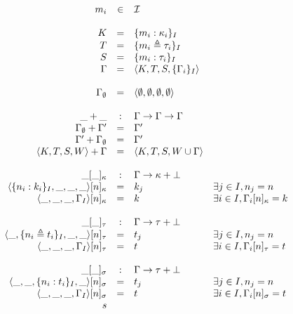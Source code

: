 \documentclass{article}[11pt]
\begin{document}
    \begin{math}
        \begin{array}{rcll}
            m_i & \in & {\cal I} \\
            \\
            K       & =   & \{ m_i : \kappa_i \}_I            \\
            T       & =   & \{ m_i \triangleq \tau_i \}_I     \\
            S       & =   & \{ m_i : \tau_i \}_I              \\
            \Gamma  & =   & \langle K, T, S, \{ \Gamma_i \}_I \rangle        \\
            \\
            \Gamma_\emptyset & = & \langle \emptyset, \emptyset, \emptyset, \emptyset \rangle \\
            \\
            \_+\_         & : & \Gamma \rightarrow \Gamma \rightarrow \Gamma \\
            \Gamma_\emptyset + \Gamma' & = & \Gamma'    \\
            \Gamma' + \Gamma_\emptyset & = & \Gamma' \\
            \langle K, T, S, W \rangle + \Gamma & =& \langle K, T, S, W \cup \Gamma \rangle \\
            \\
            \_[\_]_\kappa & : & \Gamma \rightarrow \kappa + \bot \\
            \langle \{n_i:k_i\}_I, \_, \_, \_\rangle[n]_\kappa & = & k_j & \exists j \in I, n_j = n \\
            \langle \_, \_, \_, \Gamma_I\rangle[n]_\kappa & = & k & \exists i \in I, \Gamma_i[n]_\kappa = k \\
            \\
            \_[\_]_\tau & : & \Gamma \rightarrow \tau + \bot \\
            \langle \_, \{n_i \triangleq t_i\}_I, \_, \_\rangle[n]_\tau & = & t_j & \exists j \in I, n_j = n \\
            \langle \_, \_, \_, \Gamma_I\rangle[n]_\tau & = & t & \exists i \in I, \Gamma_i[n]_\tau = t \\
            \\
            \_[\_]_\sigma & : & \Gamma \rightarrow \tau + \bot \\
            \langle \_, \_, \{n_i:t_i\}_I, \_\rangle[n]_\sigma & = & t_j & \exists j \in I, n_j = n \\
            \langle \_, \_, \_, \Gamma_I\rangle[n]_\sigma & = & t & \exists i \in I, \Gamma_i[n]_\sigma = t \\s
        \end{array}
    \end{math}
\end{document}
